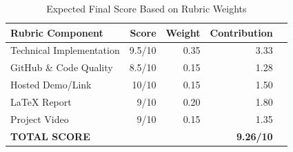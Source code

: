 \documentclass[11pt,a4paper]{article}
\begin{document}
\begin{table}[h!]
    \centering
    \begin{tabular}{lrrrr}
        \toprule
        \textbf{Rubric Component} & \textbf{Score} & \textbf{Weight} & \textbf{Contribution} \\
        \midrule
        Technical Implementation & 9.5/10 & 0.35 & 3.33 \\
        GitHub \& Code Quality & 8.5/10 & 0.15 & 1.28 \\
        Hosted Demo/Link & 10/10 & 0.15 & 1.50 \\
        LaTeX Report & 9/10 & 0.20 & 1.80 \\
        Project Video & 9/10 & 0.15 & 1.35 \\
        \midrule
        \textbf{TOTAL SCORE} & & & \textbf{9.26/10} \\
        \bottomrule
    \end{tabular}
    \caption{Expected Final Score Based on Rubric Weights}
\end{table}
\end{document}
